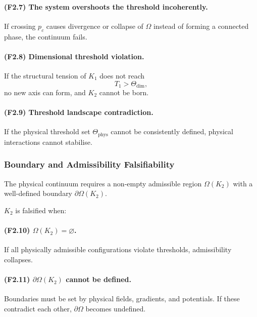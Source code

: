 \paragraph{(F2.7) The system overshoots the threshold incoherently.}
If crossing $p_c$ causes divergence or collapse of $\Omega$ instead of
forming a connected phase, the continuum fails.

\paragraph{(F2.8) Dimensional threshold violation.}
If the structural tension of $K_1$ does not reach
\[
T_1 > \Theta_{\mathrm{dim}},
\]
no new axis can form, and $K_2$ cannot be born.

\paragraph{(F2.9) Threshold landscape contradiction.}
If the physical threshold set $\Theta_{\mathrm{phys}}$ cannot be
consistently defined, physical interactions cannot stabilise.



\subsubsection{Boundary and Admissibility Falsifiability}

The physical continuum requires a non-empty admissible region
$\Omega(K_2)$ with a well-defined boundary $\partial\Omega(K_2)$.

$K_2$ is falsified when:

\paragraph{(F2.10) \texorpdfstring{$\Omega(K_2)=\varnothing$}{\Omega(K_2)=\varnothing}.}
If all physically admissible configurations violate thresholds,
admissibility collapses.

\paragraph{(F2.11) \texorpdfstring{$\partial\Omega(K_2)$}{\partial\Omega(K_2)} cannot be defined.}
Boundaries must be set by physical fields, gradients, and potentials.
If these contradict each other, $\partial\Omega$ becomes undefined.

